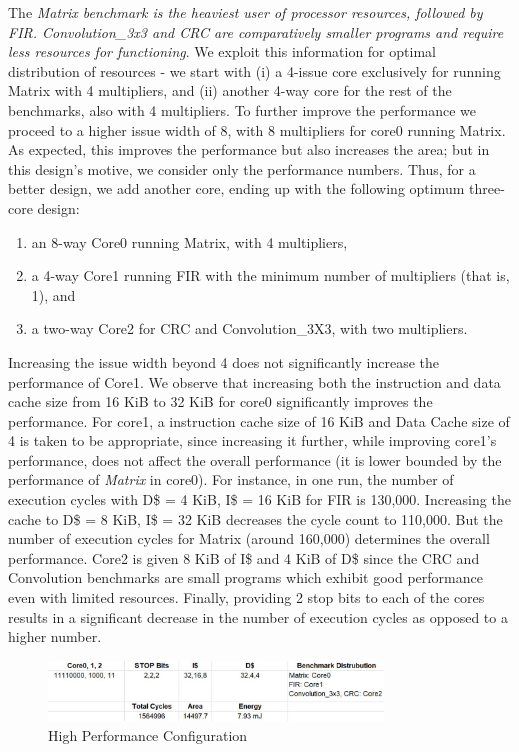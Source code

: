 \documentclass[conference]{IEEEtran}
\begin{document}
The \textit{Matrix benchmark is the heaviest user of processor resources, followed by FIR. Convolution\_3x3 and CRC are comparatively smaller programs and require less resources for functioning}. We exploit this information for optimal distribution of resources - we start with (i) a 4-issue core exclusively for running Matrix with 4 multipliers, and (ii) another 4-way core for the rest of the benchmarks, also with 4 multipliers. 
To further improve the performance we proceed to a higher issue width of 8, with 8 multipliers for core0 running Matrix. As expected, this improves the performance but also increases the area; but in this design's motive, we consider only the performance numbers. Thus, for a better design, we add another core, ending up with the following optimum three-core design: 
\begin{enumerate}
    \item an 8-way Core0 running Matrix, with 4 multipliers, 
    \item a 4-way Core1 running FIR with the minimum number of multipliers (that is, 1), and
    \item a two-way Core2 for CRC and Convolution\_3X3, with two multipliers. 
\end{enumerate}

Increasing the issue width beyond 4 does not significantly increase the performance of Core1.
We observe that increasing both the instruction and data cache size from 16 KiB to 32 KiB for core0 significantly improves the performance. For core1, a instruction cache size of 16 KiB and Data Cache size of 4 is taken to be appropriate, since increasing it further, while improving core1's performance, does not affect the overall performance (it is lower bounded by the performance of \textit{Matrix} in core0). For instance, in one run, the number of execution cycles with D\$ = 4 KiB, I\$ = 16 KiB for FIR is 130,000. Increasing the cache to D\$ = 8 KiB, I\$ = 32 KiB decreases the cycle count to 110,000. But the number of execution cycles for Matrix (around 160,000) determines the overall performance. Core2 is given 8 KiB of I\$ and 4 KiB of D\$ since the CRC and Convolution benchmarks are small programs which exhibit good performance even with limited resources. Finally, providing 2 stop bits to each of the cores results in a significant decrease in the number of execution cycles as opposed to a higher number.

\begin{figure}[h!]
\centering
\includegraphics[width=3.5in]{HighPerf.JPG}
\caption{\label{fig:data}High Performance Configuration }
\end{figure}
\end{document}
